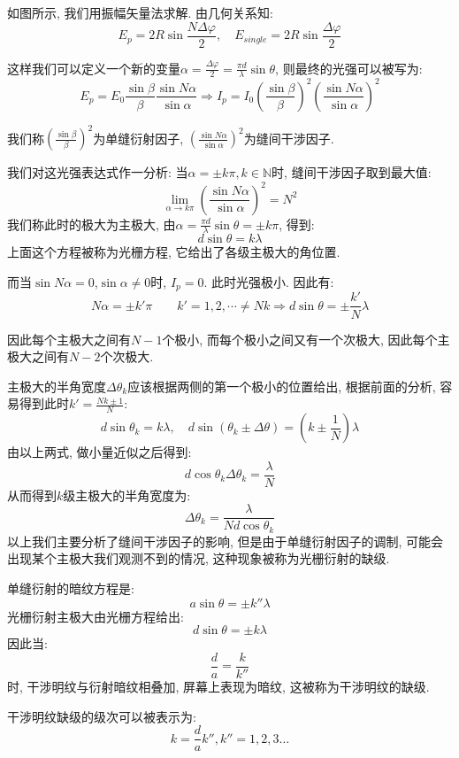 
如图所示, 我们用振幅矢量法求解. 由几何关系知:
\[
E_p = 2R\sin \frac{N\Delta\varphi}{2}, \quad E_{single} = 2R\sin\frac{\Delta \varphi}{2}
\]

这样我们可以定义一个新的变量$\alpha=\frac{\Delta \varphi}{2}=\frac{\pi d}{\lambda}\sin\theta$, 则最终的光强可以被写为:
\[
E_p = E_0 \frac{\sin \beta}{\beta}\frac{\sin N\alpha}{\sin \alpha} \Rightarrow I_p = I_0(\frac{\sin \beta}{\beta})^2(\frac{\sin N\alpha}{\sin \alpha})^2
\]

我们称$(\frac{\sin \beta}{\beta})^2$为单缝衍射因子, $(\frac{\sin N\alpha}{\sin \alpha})^2$为缝间干涉因子.


我们对这光强表达式作一分析: 当$\alpha=\pm k\pi,k\in \mathbb{N}$时, 缝间干涉因子取到最大值:
\[
\lim_{\alpha \to k\pi} (\frac{\sin N\alpha}{\sin \alpha})^2 = N^2
\]
我们称此时的极大为主极大, 由$\alpha = \frac{\pi d}{\lambda}\sin\theta = \pm k \pi$, 得到:
\[
d\sin\theta = k\lambda
\]
上面这个方程被称为光栅方程, 它给出了各级主极大的角位置.

而当$\sin N\alpha = 0$,$\sin\alpha\neq 0$时, $I_p=0$. 此时光强极小.
因此有:
\[
N\alpha = \pm k' \pi \qquad k' = 1,2,\cdots \neq Nk \Rightarrow d\sin\theta= \pm\frac{k'}{N}\lambda
\]

因此每个主极大之间有$N-1$个极小, 而每个极小之间又有一个次极大, 因此每个主极大之间有$N-2$个次极大.

主极大的半角宽度$\Delta \theta_k$应该根据两侧的第一个极小的位置给出, 根据前面的分析, 容易得到此时$k' = \frac{Nk\pm1}{N}$:
\[
d\sin\theta_k  = k\lambda, \quad d\sin(\theta_k\pm\Delta \theta) = (k\pm\frac{1}{N})\lambda
\]
由以上两式, 做小量近似之后得到:
\[
d\cos\theta_k \Delta \theta_k = \frac{\lambda}{N}
\]
从而得到$k$级主极大的半角宽度为:
\[
\Delta \theta_k = \frac{\lambda}{Nd\cos\theta_k}
\]
以上我们主要分析了缝间干涉因子的影响, 但是由于单缝衍射因子的调制, 可能会出现某个主极大我们观测不到的情况, 这种现象被称为光栅衍射的缺级.

单缝衍射的暗纹方程是:
\[
a\sin\theta = \pm k'' \lambda
\]
光栅衍射主极大由光栅方程给出:
\[
d\sin\theta = \pm k \lambda
\]
因此当:
\[
\frac{d}{a} = \frac{k}{k''}
\]
时, 干涉明纹与衍射暗纹相叠加, 屏幕上表现为暗纹, 这被称为干涉明纹的缺级.

干涉明纹缺级的级次可以被表示为:
\[
k = \frac{d}{a}k'', k'' = 1,2,3\dots
\]


